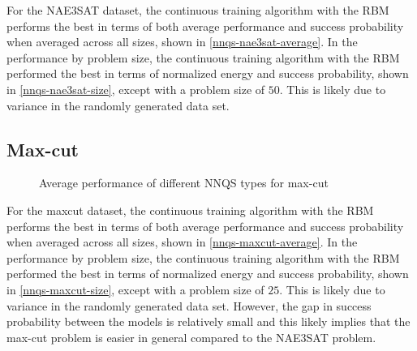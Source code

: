 For the NAE3SAT dataset, the continuous training algorithm with the RBM performs the best in terms of both average performance and success probability when averaged across all sizes, shown in \autoref{nnqs-nae3sat-average}. In the performance by problem size, the continuous training algorithm with the RBM performed the best in terms of normalized energy and success probability, shown in \autoref{nnqs-nae3sat-size}, except with a problem size of $50$. This is likely due to variance in the randomly generated data set. 

\subsection{Max-cut}

\begin{figure}[!htbp]
    \centering
    \hfill
    \caption{Average performance of different NNQS types for max-cut}
    \label{nnqs-maxcut-average}
\end{figure}

For the maxcut dataset, the continuous training algorithm with the RBM performs the best in terms of both average performance and success probability when averaged across all sizes, shown in \autoref{nnqs-maxcut-average}. In the performance by problem size, the continuous training algorithm with the RBM performed the best in terms of normalized energy and success probability, shown in \autoref{nnqs-maxcut-size}, except with a problem size of $25$. This is likely due to variance in the randomly generated data set. However, the gap in success probability between the models is relatively small and this likely implies that the max-cut problem is easier in general compared to the NAE3SAT problem.


